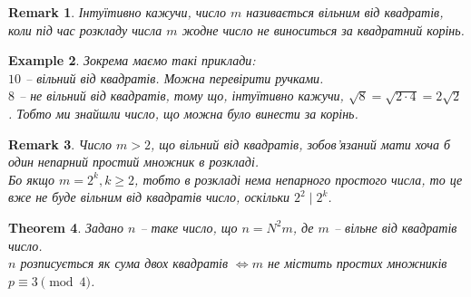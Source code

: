 \documentclass[a4paper, 10pt]{article}
\theoremstyle{theoremdd}
\newtheorem{theorem}{Theorem}[subsection]
\theoremstyle{theoremdd}
\theoremstyle{theoremdd}
\theoremstyle{theoremdd}
\newtheorem{example}[theorem]{Example}
\theoremstyle{theoremdd}
\theoremstyle{theoremdd}
\newtheorem{remark}[theorem]{Remark}
\theoremstyle{theoremdd}
\theoremstyle{theoremdd}
\begin{document}
\begin{remark}
Інтуїтивно кажучи, число $m$ називається вільним від квадратів, коли під час розкладу числа $m$ жодне число не виноситься за квадратний корінь.
\end{remark}

\begin{example}
Зокрема маємо такі приклади:\\
$10$ -- вільний від квадратів. Можна перевірити ручками.\\
$8$ -- не вільний від квадратів, тому що, інтуїтивно кажучи, $\sqrt{8} = \sqrt{2 \cdot 4} = 2 \sqrt{2}$. Тобто ми знайшли число, що можна було винести за корінь.
\end{example}

\begin{remark}
Число $m>2$, що вільний від квадратів, зобов'язаний мати хоча б один непарний простий множник в розкладі.\\
Бо якщо $m = 2^k, k \geq 2$, тобто в розкладі нема непарного простого числа, то це вже не буде вільним від квадратів число, оскільки $2^2 \mid 2^k$.
\end{remark}

\begin{theorem}
Задано $n$ -- таке число, що $n = N^2m$, де $m$ -- вільне від квадратів число.\\
$n$ розписується як сума двох квадратів $\iff m$ не містить простих множників $p \equiv 3 \pmod 4$.
\end{theorem}
\end{document}

